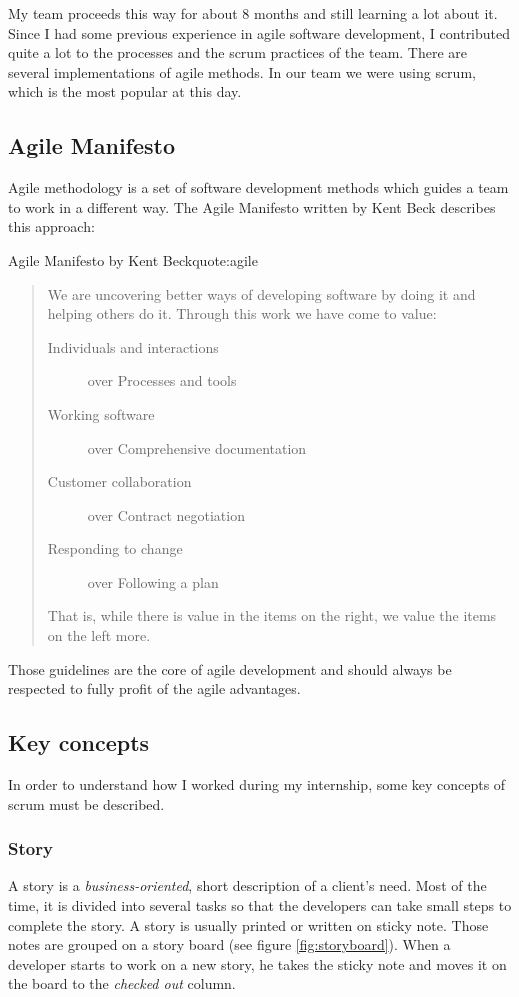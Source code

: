My team proceeds this way for about 8 months and still learning a lot about it.
Since I had some previous experience in agile software development, I contributed quite a lot
to the processes and the \gls{scrum} practices of the team.
There are several implementations of agile methods. In our team we were using \gls{scrum}, which is the most popular at this day.

\subsection{Agile Manifesto}
Agile methodology is a set of software development methods which guides a team to work in a different way.
The Agile Manifesto written by Kent Beck describes this approach:

\begin{figureGraphics}{Agile Manifesto by Kent Beck}{quote:agile}
\begin{quotation}
    We are uncovering better ways of developing software by doing it and helping others do it. Through this work we have come to value:
    \begin{description}
        \item[Individuals and interactions] over Processes and tools
        \item[Working software] over Comprehensive documentation
        \item[Customer collaboration] over Contract negotiation
        \item[Responding to change] over Following a plan
    \end{description}
    That is, while there is value in the items on the right, we value the items on the left more.
\end{quotation}
\end{figureGraphics}

Those guidelines are the core of agile development and should always be respected to fully profit of the
agile advantages.

\subsection{Key concepts}
In order to understand how I worked during my internship, some key concepts of \gls{scrum} must be described.

\subsubsection{Story}\label{sec:story}
A story is a \emph{business-oriented}, short description of a client's need.
Most of the time, it is divided into several tasks so that the developers
can take small steps to complete the story. A story is usually printed or
written on sticky note. Those notes are grouped on a story board (see figure
\ref{fig:storyboard}). When a developer starts to work on a new story, he takes
the sticky note and moves it on the board to the \emph{checked out} column.

